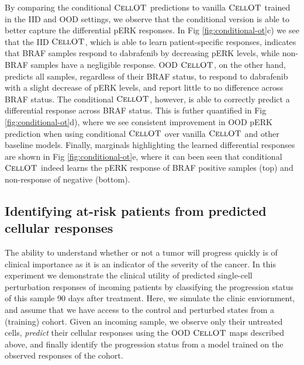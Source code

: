 By comparing the conditional $\textsc{CellOT}$ predictions to vanilla $\textsc{CellOT}$ trained in the IID and OOD settings, we observe that the conditional version is able to better capture the differential pERK responses.
In Fig \ref{fig:conditional-ot}c) we see that the IID $\textsc{CellOT}$, which is able to learn patient-specific responses, indicates that BRAF samples respond to dabrafenib by decreasing pERK levels, while non-BRAF samples have a negligible response.
OOD $\textsc{CellOT}$, on the other hand, predicts all samples, regardless of their BRAF status, to respond to dabrafenib with a slight decrease of pERK levels, and report little to no difference across BRAF status.
The conditional $\textsc{CellOT}$, however, is able to correctly predict a differential response across BRAF status.
This is futher quantified in Fig \ref{fig:conditional-ot}d), where we see consistent improvement in OOD pERK prediction when using conditional $\textsc{CellOT}$ over vanilla $\textsc{CellOT}$ and other baseline models.
Finally, marginals highlighting the learned differential responses are shown in Fig \ref{fig:conditional-ot}e,
where it can been seen that conditional $\textsc{CellOT}$ indeed learns the pERK response of BRAF positive samples (top) and non-response of negative (bottom).

\subsection{Identifying at-risk patients from predicted cellular responses}
The ability to understand whether or not a tumor will progress quickly is of clinical importance as it is an indicator of the severity of the cancer.
In this experiment we demonstrate the clinical utility of predicted single-cell perturbation responses of incoming patients by classifying the progression status of this sample 90 days after treatment.
Here, we simulate the clinic enviornment, and assume that we have access to the control and perturbed states from a (training) cohort.
Given an incoming sample, we observe only their untreated cells, \emph{predict} their cellular responses using the OOD $\textsc{CellOT}$ maps described above, and finally identify the progression status from a model trained on the observed responses of the cohort.

